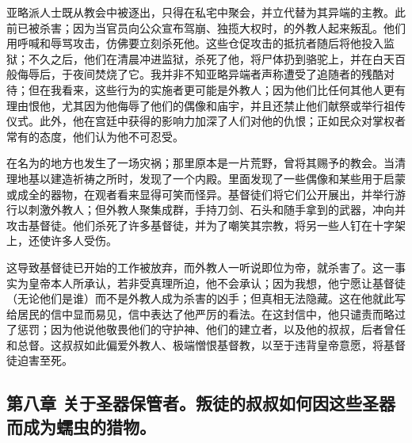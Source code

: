 亚略派人士既从教会中被逐出，只得在私宅中聚会，并立代替为其异端的主教。此前已被杀害；因为当官员向公众宣布驾崩、独揽大权时，的外教人起来叛乱。他们用呼喊和辱骂攻击，仿佛要立刻杀死他。这些仓促攻击的抵抗者随后将他投入监狱；不久之后，他们在清晨冲进监狱，杀死了他，将尸体扔到骆驼上，并在白天百般侮辱后，于夜间焚烧了它。我并非不知亚略异端者声称遭受了追随者的残酷对待；但在我看来，这些行为的实施者更可能是外教人；因为他们比任何其他人更有理由恨他，尤其因为他侮辱了他们的偶像和庙宇，并且还禁止他们献祭或举行祖传仪式。此外，他在宫廷中获得的影响力加深了人们对他的仇恨；正如民众对掌权者常有的态度，他们认为他不可忍受。\par

在名为的地方也发生了一场灾祸；那里原本是一片荒野，曾将其赐予的教会。当清理地基以建造祈祷之所时，发现了一个内殿。里面发现了一些偶像和某些用于启蒙或成全的器物，在观者看来显得可笑而怪异。基督徒们将它们公开展出，并举行游行以刺激外教人；但外教人聚集成群，手持刀剑、石头和随手拿到的武器，冲向并攻击基督徒。他们杀死了许多基督徒，并为了嘲笑其宗教，将另一些人钉在十字架上，还使许多人受伤。\par

这导致基督徒已开始的工作被放弃，而外教人一听说即位为帝，就杀害了。这一事实为皇帝本人所承认，若非受真理所迫，他不会承认；因为我想，他宁愿让基督徒（无论他们是谁）而不是外教人成为杀害的凶手；但真相无法隐藏。这在他就此写给居民的信中显而易见，信中表达了他严厉的看法。在这封信中，他只谴责而略过了惩罚；因为他说他敬畏他们的守护神、他们的建立者，以及他的叔叔，后者曾任和总督。这叔叔如此偏爱外教人、极端憎恨基督教，以至于违背皇帝意愿，将基督徒迫害至死。\par


\subsection{第八章 关于圣器保管者。叛徒的叔叔如何因这些圣器而成为蠕虫的猎物。}

